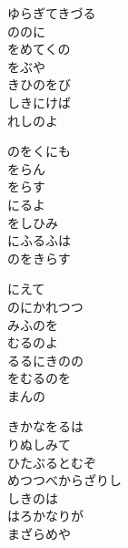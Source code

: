 \documentclass[10pt,b5j]{tarticle} %
\begin{document}
\begin{enumerate}
\begin{minipage}[c]{\blocksize}
        \vspace{\linespace}
        \item
        ゆらぎてきづる\\
        ののに\\
        をめてくの\\
        をぶや\\
        きひのをび\\
        しきにけば\\
        れしのよ
        
        \vspace{\linespace}
        \item
        のをくにも\\
        をらん\\
        をらす\\
        にるよ\\
        をしひみ\\
        にふるふは\\
        のをきらす
        
        \vspace{\linespace}
        \item
        にえて\\
        のにかれつつ\\
        みふのを\\
        むるのよ\\
        るるにきのの\\
        をむるのを\\
        まんの
        
        \vspace{\linespace}
        \item
        きかなをるは\\
        りぬしみて\\
        ひたぶるとむぞ\\
        めつつべからざりし\\
        しきのは\\
        はろかなりが\\
        まざらめや
    

\end{minipage}
\end{enumerate}
\end{document}

